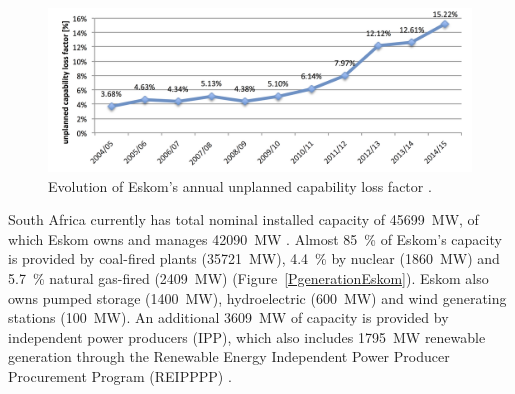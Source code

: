 \begin{figure}[htbp]  
\centering
\includegraphics[width=1\linewidth]{FIG/UCLF}
\caption[Evolution of Eskom's annual unplanned capability loss factor.]{Evolution of Eskom's annual unplanned capability loss factor \cite{Eskom2015b,Eskom2015d}.}\label{UCLF}
\end{figure}

South Africa currently has total nominal installed capacity of \SI{45699}{\mega\watt}, of which Eskom owns and manages \SI{42090}{\mega\watt} \cite{Eskom2015b}. Almost \SI{85}{\percent} of Eskom's capacity is provided by coal-fired plants (\SI{35721}{\mega\watt}), \SI{4.4}{\percent} by nuclear (\SI{1860}{\mega\watt}) and \SI{5.7}{\percent} natural gas-fired (\SI{2409}{\mega\watt}) (Figure~\ref{PgenerationEskom}). Eskom also owns pumped storage (\SI{1400}{\mega\watt}), hydroelectric (\SI{600}{\mega\watt}) and wind generating stations (\SI{100}{\mega\watt}). An additional \SI{3609}{\mega\watt} of capacity is provided by independent power producers (IPP), which also includes \SI{1795}{\mega\watt} renewable generation through the Renewable Energy Independent Power Producer Procurement Program (REIPPPP) \cite{Eskom2015a}.

